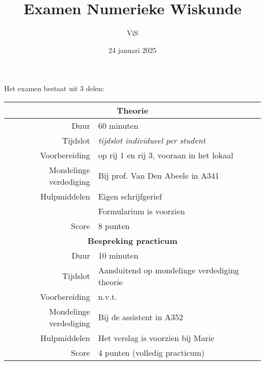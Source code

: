 \documentclass[kulak]{kulakarticle}
\title{Examen Numerieke Wiskunde}
\author{ViS}
\date{24 januari 2025}
\begin{document}
	\maketitle

	Het examen bestaat uit 3 delen:

	\begin{table}[h!]
		\renewcommand{\arraystretch}{1.3}
		\begin{tabular}{r l}
			\hline
			                               \multicolumn{2}{c}{\textbf{Theorie}}                                \\ \hline
			                  Duur & 60 minuten                                                                \\
			              Tijdslot & \textit{tijdslot individueel per student}                                 \\
			         Voorbereiding & op rij 1 en rij 3, vooraan in het lokaal                                  \\
			Mondelinge verdediging & Bij prof. Van Den Abeele in A341                                          \\
			          Hulpmiddelen & Eigen schrijfgerief                                                       \\
			                       & Formularium is voorzien                                                   \\
			                 Score & 8 punten                                                                  \\ \hline
			                        \multicolumn{2}{c}{\textbf{Bespreking practicum}}                          \\ \hline
			                  Duur & 10 minuten                                                                \\
			              Tijdslot & Aansluitend op mondelinge verdediging theorie                             \\
			         Voorbereiding & n.v.t.                                                                    \\
			Mondelinge verdediging & Bij de assistent in A352                                                  \\
			          Hulpmiddelen & Het verslag is voorzien bij Marie                                         \\
			                 Score & 4 punten (volledig practicum)                                             \\ \hline

\end{tabular}
\end{table}
\end{document}
